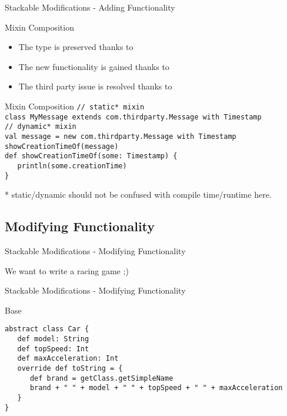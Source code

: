 \begin{frame}[fragile]{Stackable Modifications - Adding Functionality}
\begin{block}{Mixin Composition}
\begin{itemize}
   \item The type is preserved thanks to 
   \item The new functionality is gained thanks to 
   \item The third party issue is resolved thanks to 
\end{itemize}
\end{block}
\begin{exampleblock}{Mixin Composition}
\lstinline!// static* mixin!\\
\lstinline!class MyMessage extends com.thirdparty.Message with Timestamp!\\
\lstinline!// dynamic* mixin!\\
\lstinline!val message = new com.thirdparty.Message with Timestamp!\\
\lstinline!showCreationTimeOf(message)!\\
\lstinline!def showCreationTimeOf(some: Timestamp) {!\\
\lstinline!   println(some.creationTime)!\\
\lstinline!}!\\
\end{exampleblock}
* static/dynamic should not be confused with compile time/runtime here.
\end{frame}

\subsection{Modifying Functionality}

\begin{frame}{Stackable Modifications - Modifying Functionality}
\begin{center}
We want to write a racing game ;)
\end{center}
\end{frame}

\begin{frame}[fragile]{Stackable Modifications - Modifying Functionality}
\begin{exampleblock}{Base}
\begin{lstlisting}
abstract class Car {
   def model: String
   def topSpeed: Int
   def maxAcceleration: Int
   override def toString = {
      def brand = getClass.getSimpleName
      brand + " " + model + " " + topSpeed + " " + maxAcceleration
   }
}
\end{lstlisting}
\end{exampleblock}
\end{frame}

